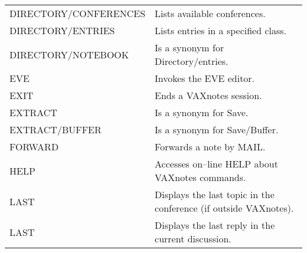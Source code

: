 \begin{tabular}{ l l }
DIRECTORY/CONFERENCES	& Lists available conferences.\\
DIRECTORY/ENTRIES	& Lists entries in a specified class.\\
DIRECTORY/NOTEBOOK	& Is a synonym for Directory/entries.\\
EVE			& Invokes the EVE editor.\\
EXIT			& Ends a VAXnotes session.\\
EXTRACT			& Is a synonym for Save.\\
EXTRACT/BUFFER		& Is a synonym for Save/Buffer.\\
FORWARD			& Forwards a note by MAIL.\\
HELP			& Accesses on--line HELP about VAXnotes commands.\\
LAST			& Displays the last topic in the conference (if outside VAXnotes).\\
LAST			& Displays the last reply in the current discussion.\\
\end{tabular}


